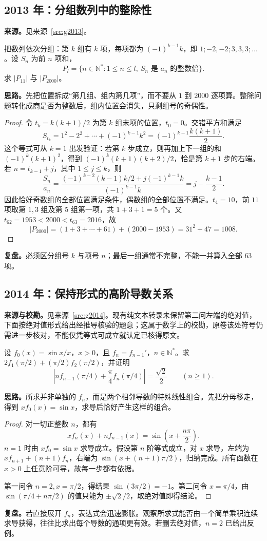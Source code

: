 \documentclass[UTF8,12pt,a4paper,fontset=fandol]{ctexart}
\begin{document}
\subsection{2013 年：分组数列中的整除性}\label{sec:g2013}
\textbf{来源。}见来源~\ref{src:g2013}。
\begin{example}[题意重述]
把数列依次分组：第 $k$ 组有 $k$ 项，每项都为 $(-1)^{k-1}k$，即 $1;-2,-2;3,3,3;\ldots$。设 $S_n$ 为前 $n$ 项和，
\[
P_l=\{n\in\mathbb N^*:1\leq n\leq l,\ S_n\text{ 是 }a_n\text{ 的整数倍}\}.
\]
求 $|P_{11}|$ 与 $|P_{2000}|$。
\end{example}
\textbf{思路。}先把位置拆成“第几组、组内第几项”，而不要从 $1$ 到 $2000$ 逐项算。整除问题转化成商是否为整数后，组内位置会消失，只剩组号的奇偶性。
\begin{proof}
令 $t_k=k(k+1)/2$ 为第 $k$ 组末项的位置，$t_0=0$。交错平方和满足
\[
S_{t_k}=1^2-2^2+\cdots+(-1)^{k-1}k^2
=(-1)^{k-1}\frac{k(k+1)}2.
\]
这个等式可从 $k=1$ 出发验证：若第 $k$ 步成立，则再加上下一组的和 $(-1)^k(k+1)^2$，得到 $(-1)^k(k+1)(k+2)/2$，恰是第 $k+1$ 步的右端。若 $n=t_{k-1}+j$，其中 $1\leq j\leq k$，则
\[
\frac{S_n}{a_n}
=\frac{(-1)^{k-2}(k-1)k/2+j(-1)^{k-1}k}{(-1)^{k-1}k}
=j-\frac{k-1}{2}.
\]
因此恰好奇数组的全部位置满足条件，偶数组的全部位置不满足。$t_4=10$，前 $11$ 项取第 $1,3$ 组及第 $5$ 组第一项，共 $1+3+1=5$ 个。又 $t_{62}=1953<2000<t_{63}=2016$，故
\[
|P_{2000}|=(1+3+\cdots+61)+(2000-1953)=31^2+47=1008.
\]
\end{proof}
\textbf{复盘。}必须区分组号 $k$ 与项号 $n$；最后一组通常不完整，不能一并算入全部 $63$ 项。

\subsection{2014 年：保持形式的高阶导数关系}\label{sec:g2014}
\textbf{来源与校勘。}见来源~\ref{src:g2014}。现有纯文本转录未保留第二问左端的绝对值，下面按绝对值形式给出经推导核验的题意；这属于数学上的校勘，原卷该处符号仍需进一步核对，不能仅凭等式可成立就认定已核得原文。
\begin{example}[题意重述]
设 $f_0(x)=\sin x/x$，$x>0$，且 $f_n=f_{n-1}'$，$n\in\mathbb N^*$。求 $2f_1(\pi/2)+(\pi/2)f_2(\pi/2)$，并证明
\[
\left|n f_{n-1}(\pi/4)+\frac\pi4f_n(\pi/4)\right|=\frac{\sqrt2}{2}\qquad(n\geq1).
\]
\end{example}
\textbf{思路。}所求并非单独的 $f_n$，而是两个相邻导数的特殊线性组合。先把分母移走，得到 $xf_0(x)=\sin x$，求导后恰好产生这样的组合。
\begin{proof}
对一切正整数 $n$，都有
\begin{equation}\label{eq:g2014}
xf_n(x)+nf_{n-1}(x)=\sin\left(x+\frac{n\pi}{2}\right).
\end{equation}
$n=1$ 时由 $xf_0=\sin x$ 求导成立。假设第 $n$ 阶等式成立，对 $x$ 求导，左端为 $xf_{n+1}+(n+1)f_n$，右端为 $\sin(x+(n+1)\pi/2)$，归纳完成。所有函数在 $x>0$ 上任意阶可导，故每一步都有依据。

第一问令 $n=2,x=\pi/2$，得结果 $\sin(3\pi/2)=-1$。第二问令 $x=\pi/4$，由 $\sin(\pi/4+n\pi/2)$ 的值只能为 $\pm\sqrt2/2$，取绝对值即得结论。
\end{proof}
\textbf{复盘。}若直接展开 $f_n$，表达式会迅速膨胀。观察所求式能否由一个简单乘积连续求导获得，往往比求出每个导数的通项更有效。若删去绝对值，$n=2$ 已给出反例。
\end{document}
